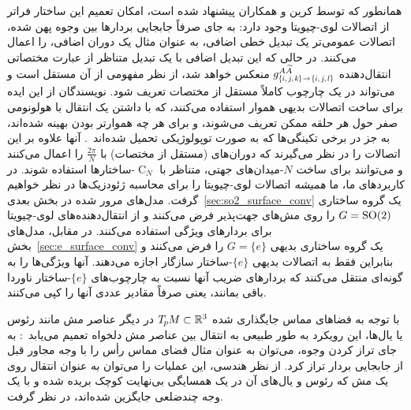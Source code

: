 همانطور که توسط کرین و همکاران\cite{craneTrivialConnectionsDiscrete2010} پیشنهاد شده است، امکان تعمیم این ساختار فراتر از اتصالات لوی-چیویتا وجود دارد:
به جای صرفاً جابجایی بردارها بین وجوه پهن شده، اتصالات عمومی‌تر یک تبدیل خطی اضافی، به عنوان مثال یک دوران اضافی، را اعمال می‌کنند.
در حالی که این تبدیل اضافی با یک تبدیل متناظر از عبارت مختصاتی انتقال‌دهنده
$g^{A\widetilde{A}}_{\protect\scalebox{.68}{$\{i,j,k\mkern-1mu\}\!\to\!\{i,j,l\}$}}$
منعکس خواهد شد، از نظر مفهومی از آن مستقل است و می‌تواند در یک چارچوب کاملاً مستقل از مختصات تعریف شود.
نویسندگان از این ایده برای ساخت اتصالات بدیهی هموار استفاده می‌کنند، که با داشتن یک انتقال با هولونومی صفر حول هر حلقه ممکن تعریف می‌شوند، و برای هر چه هموارتر بودن بهینه شده‌اند، به جز در برخی تکینگی‌ها که به صورت توپولوژیکی تحمیل شده‌اند~\cite{craneTrivialConnectionsDiscrete2010}.
آنها علاوه بر این اتصالات را در نظر می‌گیرند که دوران‌های (مستقل از مختصات) با $\frac{2\pi}{N}$ را اعمال می‌کنند و می‌توانند برای ساخت $N$-میدان‌های جهتی، متناظر با $\operatorname{C}_N$-ساختارها استفاده شوند.
در کاربردهای ما، ما \emph{همیشه} اتصالات لوی-چیویتا را برای محاسبه ژئودزیک‌ها در نظر خواهیم گرفت.
مدل‌های مرور شده در بخش بعدی~\ref{sec:so2_surface_conv} یک گروه ساختاری $G=\operatorname{SO}(2)$ را روی مش‌های جهت‌پذیر فرض می‌کنند و از انتقال‌دهنده‌های لوی-چیویتا برای بردارهای ویژگی استفاده می‌کنند.
در مقابل، مدل‌های بخش~\ref{sec:e_surface_conv} یک گروه ساختاری بدیهی $G=\{e\}$ را فرض می‌کنند و بنابراین فقط به اتصالات بدیهی $\{e\}$-ساختار سازگار اجازه می‌دهند.
آنها ویژگی‌ها را به گونه‌ای منتقل می‌کنند که بردارهای ضریب آنها نسبت به چارچوب‌های $\{e\}$-ساختار ناوردا باقی بمانند، یعنی صرفاً مقادیر عددی آنها را کپی می‌کنند.


با توجه به فضاهای مماس جایگذاری شده $T_{\mkern-1.5mu p}\mkern-.5muM \subset \mathbb{R}^3$ در دیگر عناصر مش مانند رئوس یا یال‌ها، این رویکرد به طور طبیعی به انتقال بین عناصر مش دلخواه تعمیم می‌یابد~\cite{deHaan2020meshCNNs}:
به جای تراز کردن وجوه، می‌توان به عنوان مثال فضای مماس رأس را با وجه مجاور قبل از جابجایی بردار تراز کرد.
از نظر هندسی، این عملیات را می‌توان به عنوان انتقال روی یک مش که رئوس و یال‌های آن در یک همسایگی بی‌نهایت کوچک بریده شده و با یک وجه چندضلعی جایگزین شده‌اند، در نظر گرفت.


